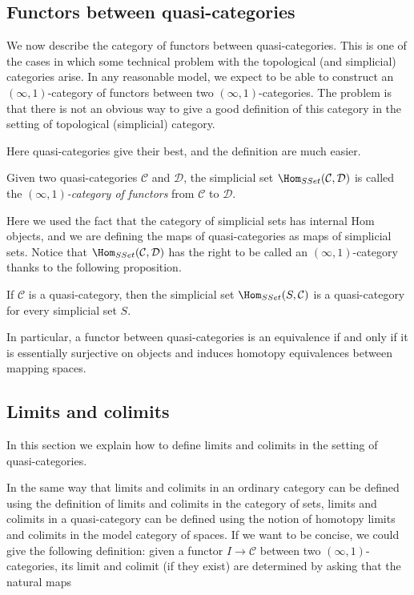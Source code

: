 \begin{refsection}
\subsection{Functors between quasi-categories}

We now describe the category of functors between quasi-categories. This is one of the cases in which some technical problem with the topological (and simplicial) categories arise. In any reasonable model, we expect to be able to construct an $(\infty,1)$-category of functors between two $(\infty,1)$-categories. The problem is that there is not an obvious way to give a good definition of this category in the setting of topological (simplicial) category.

Here quasi-categories give their best, and the definition are much easier.

\begin{defin}
Given two quasi-categories $\mathcal C$ and $\mathcal D$, the simplicial set $\Hom_{SSet}(\mathcal C,\mathcal D)$ is called the \emph{$(\infty,1)$-category of functors} from $\mathcal C$ to $\mathcal D$.
\end{defin}

Here we used the fact that the category of simplicial sets has internal Hom objects, and we are defining the maps of quasi-categories as maps of simplicial sets. Notice that $\Hom_{SSet}(\mathcal C,\mathcal D)$ has the right to be called an $(\infty,1)$-category thanks to the following proposition.

\begin{prop}
If $\mathcal C$ is a quasi-category, then the simplicial set $\Hom_{SSet}(S,\mathcal C)$ is a quasi-category for every simplicial set $S$.
\end{prop}

In particular, a functor between quasi-categories is an equivalence if and only if it is essentially surjective on objects and induces homotopy equivalences between mapping spaces.


\subsection{Limits and colimits}

In this section we explain how to define limits and colimits in the setting of quasi-categories.

In the same way that limits and colimits in an ordinary category can be defined using the definition of limits and colimits in the category of sets, limits and colimits in a quasi-category can be defined using the notion of homotopy limits and colimits in the model category of spaces.
If we want to be concise, we could give the following definition: given a functor $I \to \mathcal C$ between two $(\infty,1)$-categories, its limit and colimit (if they exist) are determined by asking that the natural maps


\end{refsection}
